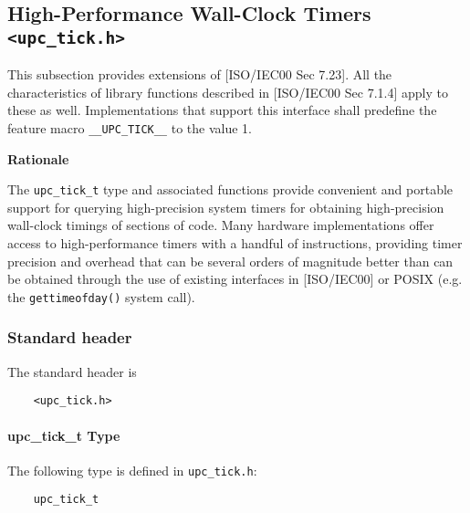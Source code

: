 \cbstart
\subsection{High-Performance Wall-Clock Timers {\tt <upc\_tick.h>}}
\label{upc-tick}

\npf This subsection provides extensions of [ISO/IEC00 Sec 7.23].
    All the characteristics of library functions described
    in [ISO/IEC00 Sec 7.1.4] apply to these as well.  Implementations
    that support this interface shall predefine the feature macro
    {\tt \_\_UPC\_TICK\_\_} to the value 1.

{\bf Rationale}

\np The {\tt upc\_tick\_t} type and associated functions 
provide convenient and portable support for
querying high-precision system timers for obtaining high-precision wall-clock timings of
sections of code. Many hardware implementations offer access to high-performance timers
with a handful of instructions, providing timer precision and overhead that can
be several orders of magnitude better than can be obtained through the use of
existing interfaces in [ISO/IEC00] or POSIX (e.g. the {\tt gettimeofday()} system call).


\subsubsection{Standard header}

\npf The standard header is

\begin{verbatim}
    <upc_tick.h> 
\end{verbatim}

\np {}

\paragraph{upc\_tick\_t Type}

\npf The following type is defined in {\tt upc\_tick.h}:

\begin{verbatim}
    upc_tick_t 
\end{verbatim}

